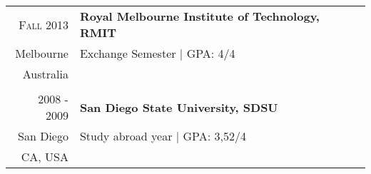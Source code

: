 \documentclass[a4paper,10pt]{article}
\begin{document}
{\begin{tabular}{r|p{16cm}}
 
\textsc{Fall} 2013&  \textbf{Royal Melbourne Institute of Technology, RMIT} \\
Melbourne & Exchange Semester | \textsc{GPA}: 4/4 \\
Australia & \\
\\
 
2008  -  2009  &  \textbf{San Diego State University, SDSU} \\
San Diego & Study abroad year | \textsc{GPA}: 3,52/4 \\
CA, USA & \\
 
\end{tabular}
 }
 
 
 
 
 
 
 
\end{document}

